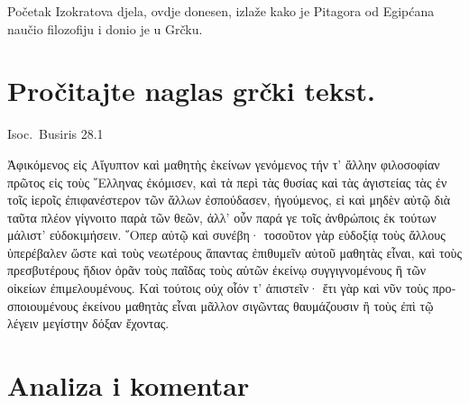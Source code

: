 Početak Izokratova djela, ovdje donesen, izlaže kako je Pitagora od Egipćana naučio filozofiju i donio je u Grčku.


\section*{Pročitajte naglas grčki tekst.}


Isoc.\ Busiris 28.1

\medskip

{\large
\begin{greek}
\noindent Ἀφικόμενος εἰς Αἴγυπτον καὶ μαθητὴς ἐκείνων γενόμενος τήν τ' ἄλλην φιλοσοφίαν πρῶτος εἰς τοὺς ῞Ελληνας ἐκόμισεν, καὶ τὰ περὶ τὰς θυσίας καὶ τὰς ἁγιστείας τὰς ἐν τοῖς ἱεροῖς ἐπιφανέστερον τῶν ἄλλων ἐσπούδασεν, ἡγούμενος, εἰ καὶ μηδὲν αὐτῷ διὰ ταῦτα πλέον γίγνοιτο παρὰ τῶν θεῶν, ἀλλ' οὖν παρά γε τοῖς ἀνθρώποις ἐκ τούτων μάλιστ' εὐδοκιμήσειν. ῞Οπερ αὐτῷ καὶ συνέβη· τοσοῦτον γὰρ εὐδοξίᾳ τοὺς ἄλλους ὑπερέβαλεν ὥστε καὶ τοὺς νεωτέρους ἅπαντας ἐπιθυμεῖν αὐτοῦ μαθητὰς εἶναι, καὶ τοὺς πρεσβυτέρους ἥδιον ὁρᾶν τοὺς παῖδας τοὺς αὑτῶν ἐκείνῳ συγγιγνομένους ἢ τῶν οἰκείων ἐπιμελουμένους. Καὶ τούτοις οὐχ οἷόν τ' ἀπιστεῖν· ἔτι γὰρ καὶ νῦν τοὺς προσποιουμένους ἐκείνου μαθητὰς εἶναι μᾶλλον σιγῶντας θαυμάζουσιν ἢ τοὺς ἐπὶ τῷ λέγειν μεγίστην δόξαν ἔχοντας.

\end{greek}

}


\section*{Analiza i komentar}



